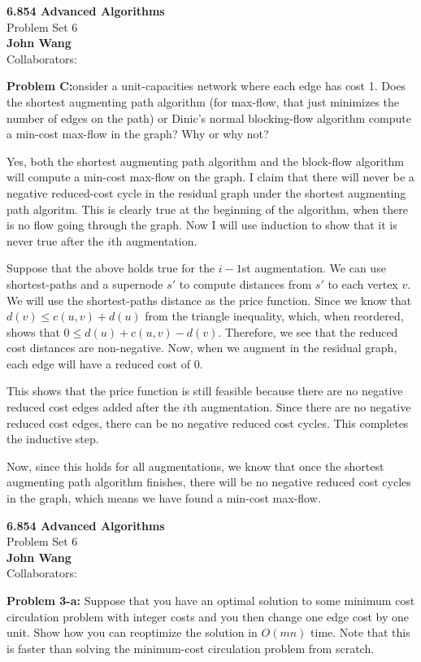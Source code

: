 \documentclass[psamsfonts]{amsart}
\newenvironment{sol}{\vspace{0.25cm}{\large \bfseries Solution:}}{\qedsymbol}
\newenvironment{prob}[1]{\begin{framed}{\large \bfseries Problem #1:}}{\end{framed}}
\newcommand{\makenewtitle}{
    \begin{center}
    {\huge \bfseries 6.854 Advanced Algorithms} \\
    Problem Set 6\\
    \vspace{0.25cm}
    {\bfseries John Wang} \\
    Collaborators: 
    \end{center}
    \vspace{0.5cm}
}
\begin{document}
\newpage
\makenewtitle

\begin{prob}
Consider a unit-capacities network where each edge has cost 1. Does the shortest augmenting path algorithm (for max-flow, that just minimizes the number of edges on the path) or Dinic's normal blocking-flow algorithm compute a min-cost max-flow in the graph? Why or why not?
\end{prob}
\begin{sol}
Yes, both the shortest augmenting path algorithm and the block-flow algorithm will compute a min-cost max-flow on the graph. I claim that there will never be a negative reduced-cost cycle in the residual graph under the shortest augmenting path algoritm. This is clearly true at the beginning of the algorithm, when there is no flow going through the graph. Now I will use induction to show that it is never true after the $i$th augmentation. 

Suppose that the above holds true for the $i-1$st augmentation. We can use shortest-paths and a supernode $s'$ to compute distances from $s'$ to each vertex $v$. We will use the shortest-paths distance as the price function. Since we know that $d(v) \leq c(u,v) + d(u)$ from the triangle inequality, which, when reordered, shows that $0 \leq d(u) + c(u,v) - d(v)$. Therefore, we see that the reduced cost distances are non-negative. Now, when we augment in the residual graph, each edge will have a reduced cost of 0.

This shows that the price function is still feasible because there are no negative reduced cost edges added after the $i$th augmentation. Since there are no negative reduced cost edges, there can be no negative reduced cost cycles. This completes the inductive step. 

Now, since this holds for all augmentations, we know that once the shortest augmenting path algorithm finishes, there will be no negative reduced cost cycles in the graph, which means we have found a min-cost max-flow.  
\end{sol}

\newpage
\makenewtitle

\begin{prob}{3-a}
Suppose that you have an optimal solution to some minimum cost circulation problem with integer costs and you then change one edge cost by one unit. Show how you can reoptimize the solution in $O(mn)$ time. Note that this is faster than solving the minimum-cost circulation problem from scratch.
\end{prob}
\end{document}
